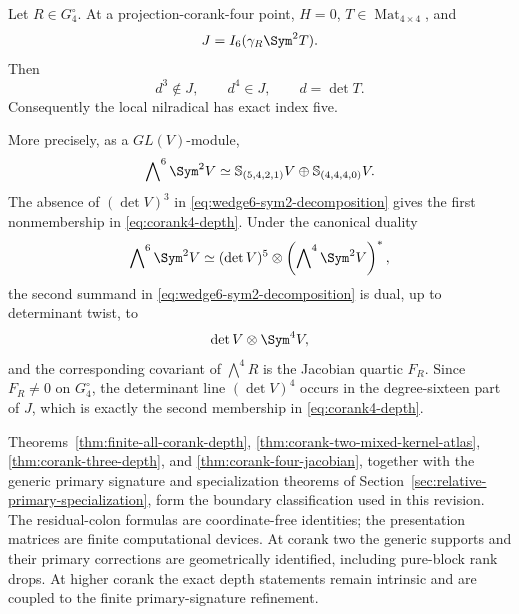\begin{theorem}
\label{thm:corank-four-jacobian}
Let \(R\in G_4^\circ\).  At a projection-corank-four point,
\(H=0\), \(T\in\operatorname{Mat}_{4\times4}\), and
\[
 J=I_6(\gamma_R\Sym^2T).
\]
Then
\begin{equation}\label{eq:corank4-depth}
 d^3\notin J,\qquad d^4\in J,\qquad d=\det T.
\end{equation}
Consequently the local nilradical has exact index five.

More precisely, as a \(GL(V)\)-module,
\begin{equation}\label{eq:wedge6-sym2-decomposition}
 \bigwedge\nolimits^6\Sym^2V
 \simeq
 \mathbb S_{(5,4,2,1)}V
 \oplus
 \mathbb S_{(4,4,4,0)}V.
\end{equation}
The absence of \((\det V)^3\) in
\eqref{eq:wedge6-sym2-decomposition} gives the first
nonmembership in \eqref{eq:corank4-depth}.  Under the canonical
duality
\[
 \bigwedge\nolimits^6\Sym^2V
 \simeq
 (\det V)^5\otimes
 \left(\bigwedge\nolimits^4\Sym^2V\right)^*,
\]
the second summand in \eqref{eq:wedge6-sym2-decomposition} is dual,
up to determinant twist, to
\[
 \det V\otimes\Sym^4V,
\]
and the corresponding covariant of \(\bigwedge^4R\) is the Jacobian
quartic \(F_R\).  Since \(F_R\ne0\) on \(G_4^\circ\), the determinant
line \((\det V)^4\) occurs in the degree-sixteen part of \(J\), which
is exactly the second membership in
\eqref{eq:corank4-depth}.
\end{theorem}

Theorems~\ref{thm:finite-all-corank-depth},
\ref{thm:corank-two-mixed-kernel-atlas},
\ref{thm:corank-three-depth}, and
\ref{thm:corank-four-jacobian}, together with the generic primary
signature and specialization theorems of
Section~\ref{sec:relative-primary-specialization}, form the boundary
classification used in this revision.  The residual-colon formulas
are coordinate-free identities; the presentation matrices are finite
computational devices.  At corank two the generic supports and their
primary corrections are geometrically identified, including pure-block
rank drops.  At higher corank the exact depth statements remain
intrinsic and are coupled to the finite primary-signature refinement.
